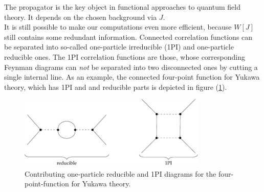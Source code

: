 The propagator is the key object in functional approaches to quantum field theory. It depends on the chosen background via $J$. \\
It is still possible to make our computations even more efficient, because $W[J]$ still contains some redundant information. Connected correlation functions can be separated into so-called one-particle irreducible (1PI) and one-particle reducible ones. The 1PI correlation functions are those, whose corresponding Feynman diagrams can \textit{not} be separated into two disconnected ones by cutting a single internal line. As an example, the connected four-point function for Yukawa theory, which has 1PI and and reducible parts is depicted in figure (\ref{fig:1PI_Yukawa}). 
\begin{figure}[t]
\centering
\includegraphics[width=0.8\textwidth]{figs/TikZ/1PI_Yukawa}
\caption{Contributing one-particle reducible and 1PI diagrams for the four-point-function for Yukawa theory.}	
\label{fig:1PI_Yukawa}
\end{figure}


